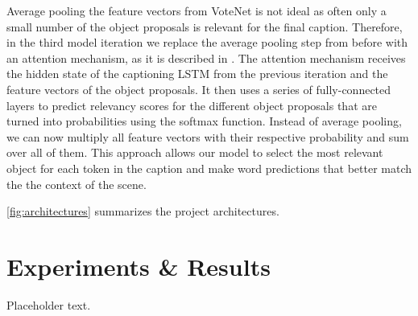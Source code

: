 \documentclass[10pt,twocolumn,letterpaper]{article}
\begin{document}
Average pooling the feature vectors from VoteNet is not ideal as often only a small number of the object proposals is relevant for the final caption. Therefore, in the third model iteration we replace the average pooling step from before with an attention mechanism, as it is described in \cite{xu2015show}. The attention mechanism receives the hidden state of the captioning LSTM from the previous iteration and the feature vectors of the object proposals. It then uses a series of fully-connected layers to predict relevancy scores for the different object proposals that are turned into probabilities using the softmax function. Instead of average pooling, we can now multiply all feature vectors with their respective probability and sum over all of them. This approach allows our model to select the most relevant object for each token in the caption and make word predictions that better match the the context of the scene.

\autoref{fig:architectures} summarizes the project architectures.

\section{Experiments \& Results}

Placeholder text.
\end{document}
